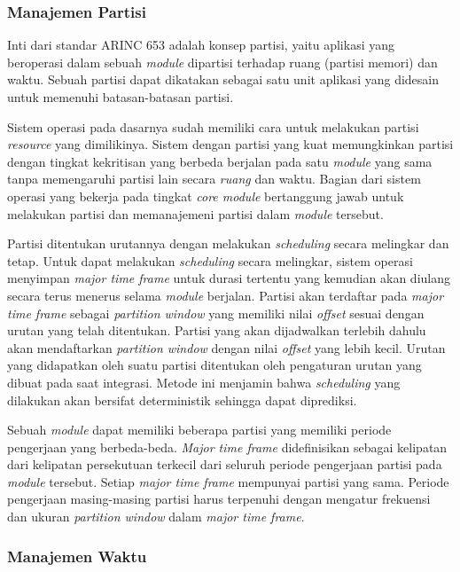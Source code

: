 \subsubsection[Manajemen Partisi]{Manajemen Partisi}

Inti dari standar ARINC 653 adalah konsep partisi, yaitu aplikasi yang beroperasi dalam sebuah
\textit{module} dipartisi terhadap ruang (partisi memori) dan waktu. Sebuah partisi dapat
dikatakan sebagai satu unit aplikasi yang didesain untuk memenuhi batasan-batasan partisi.

Sistem operasi pada dasarnya sudah memiliki cara untuk melakukan partisi \textit{resource} yang
dimilikinya.  Sistem dengan partisi yang kuat memungkinkan partisi dengan tingkat kekritisan
yang berbeda berjalan pada satu \textit{module} yang sama tanpa memengaruhi partisi lain secara
\textit{ruang} dan waktu.  Bagian dari sistem operasi yang bekerja pada tingkat \textit{core
module} bertanggung jawab untuk melakukan partisi dan memanajemeni partisi dalam \textit{module}
tersebut.

Partisi ditentukan urutannya dengan melakukan \textit{scheduling} secara melingkar dan tetap.
Untuk dapat melakukan \textit{scheduling} secara melingkar, sistem operasi menyimpan
\textit{major time frame} untuk durasi tertentu yang kemudian akan diulang secara terus menerus
selama \textit{module} berjalan.  Partisi akan terdaftar pada \textit{major time frame} sebagai
\textit{partition window} yang memiliki nilai \textit{offset} sesuai dengan urutan yang telah
ditentukan.  Partisi yang akan dijadwalkan terlebih dahulu akan mendaftarkan \textit{partition
window} dengan nilai \textit{offset} yang lebih kecil.  Urutan yang didapatkan oleh suatu
partisi ditentukan oleh pengaturan urutan yang dibuat pada saat integrasi.  Metode ini menjamin
bahwa \textit{scheduling} yang dilakukan akan bersifat deterministik sehingga dapat diprediksi.

Sebuah \textit{module} dapat memiliki beberapa partisi yang memiliki periode pengerjaan yang
berbeda-beda.  \textit{Major time frame} didefinisikan sebagai kelipatan dari kelipatan
persekutuan terkecil dari seluruh periode pengerjaan partisi pada \textit{module} tersebut.
Setiap \textit{major time frame} mempunyai partisi yang sama.  Periode pengerjaan masing-masing
partisi harus terpenuhi dengan mengatur frekuensi dan ukuran \textit{partition window} dalam
\textit{major time frame}.

\subsubsection{Manajemen Waktu}
\label{section:arinc653_scheduling}

